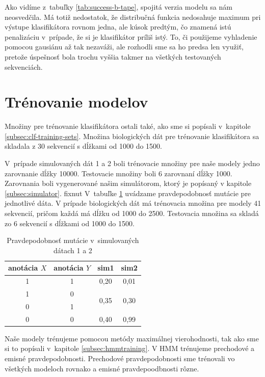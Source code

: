 Ako vidíme z~tabuľky \ref{tab:success-b-tape}, spojitá verzia modelu sa nám neosvedčila. Má totiž nedostatok, že distribučná funkcia nedosahuje maximum pri výstupe klasifikátora rovnom jedna, ale kúsok predtým, čo znamená istú penalizáciu v~prípade, že si je klasifikátor príliš istý. To, či použijeme vyhladenie pomocou gausiánu až tak nezaváži, ale rozhodli sme sa ho predsa len využiť, pretože úspešnosť bola trochu vyššia takmer na všetkých testovaných sekvenciách.

\section{Trénovanie modelov}
\label{sec:model-training}

Množiny pre trénovanie klasifikátora ostali také, ako sme si popísali v~kapitole \ref{subsec:clf-training-sets}. Množina biologických dát pre trénovanie klasifikátora sa skladala z 30 sekvencií s dĺžkami od 1000 do 1500.

V~prípade simulovaných dát 1 a 2 boli trénovacie množiny pre naše modely jedno zarovnanie dĺžky 10000. Testovacie množiny boli 6 zarovnaní dĺžky 1000. Zarovnania boli vygenerované našim simulátorom, ktorý je popísaný v kapitole \ref{subsec:simulator}.
\todo fixnut V~tabuľke \ref{tab:sim-params} uvádzame pravdepodobnosť mutácie pre jednotlivé dáta.
V prípade biologických dát má trénovacia množina pre modely 41 sekvencií, pričom každá má dĺžku od 1000 do 2500. Testovacia množina sa skladá zo 6 sekvencií s dĺžkami od 1000 do 1500.

\begin{table}
\centering
\begin{tabular}{cccc}
\toprule
anotácia $X$ & anotácia $Y$ & sim1 & sim2\\
\midrule
1 & 1 & 0,20 & 0,01\\
1 & 0 & \multirow{2}{*}{0,35} & \multirow{2}{*}{0,30}\\
0 & 1\\
0 & 0 & 0,40 & 0,99\\
\bottomrule
\end{tabular}
\caption[Pravdepodobnosť mutácie v~našich datasetoch]{Pravdepodobnosť mutácie v~simulovaných dátach 1 a 2}
\label{tab:sim-params}
\end{table}

Naše modely trénujeme pomocou metódy maximálnej vierohodnosti, tak ako sme si to popísali v~kapitole \ref{subsec:hmmtraining}. V HMM trénujeme prechodové a emisné pravdepodobnosti. Prechodové pravdepodobnosti sme trénovali vo všetkých modeloch rovnako a emisné pravdepoodbnosti rôzne.

